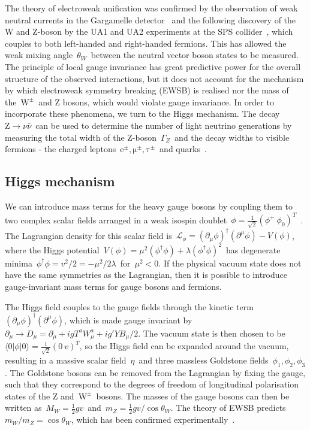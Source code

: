 The theory of electroweak unification was confirmed by the observation of weak neutral currents in the Gargamelle detector~\cite{Hasert:1973ff} and the following discovery of the W and Z-boson by the UA1 and UA2 experiments at the SPS collider~\cite{Arnison:1983mk}, which couples to both left-handed and right-handed fermions. This has allowed the weak mixing angle~$\theta_W$~between the neutral vector boson states to be measured. The principle of local gauge invariance has great predictive power for the overall structure of the observed interactions, but it does not account for the mechanism by which electroweak symmetry breaking (EWSB) is realised nor the mass of the~$\mathrm{W}^\pm$~and Z bosons, which would violate gauge invariance. In order to incorporate these phenomena, we turn to the Higgs mechanism. The decay~$\mathrm{Z} \rightarrow \nu \bar{\nu}$~can be used to determine the number of light neutrino generations by measuring the total width of the Z-boson~$\Gamma_Z$~and the decay widths to visible fermions - the charged leptons~$\mathrm{e}^\pm, \mathrm{\mu}^\pm, \mathrm{\tau}^\pm$~and quarks~\cite{Akrawy:1989pi}.

\subsection{Higgs mechanism}
We can introduce mass terms for the heavy gauge bosons by coupling them to two complex scalar fields arranged in a weak isospin doublet~$\phi = \frac{1}{\sqrt{2}} (\phi^+\ \phi_0)^T$~\cite{Higgs:1964ia,Higgs:1964pj,Englert:1964et,Guralnik:1964eu}. The Lagrangian density for this scalar field is~$\mathcal{L}_{\phi} = (\partial_\mu \phi)^\dagger (\partial^\mu \phi) - V(\phi)$, where the Higgs potential~$V(\phi) = \mu^2 (\phi^\dagger \phi) + \lambda (\phi^\dagger \phi)^2$~has degenerate minima~$\phi^\dagger \phi = v^2 / 2 = -\mu^2/2\lambda$~for~$\mu^2 < 0$. If the physical vacuum state does not have the same symmetries as the Lagrangian, then it is possible to introduce gauge-invariant mass terms for gauge bosons and fermions.

The Higgs field couples to the gauge fields through the kinetic term~$(\partial_{\mu} \phi)^\dagger (\partial^\mu \phi)$, which is made gauge invariant by~$\partial_\mu \rightarrow D_\mu = \partial_\mu + i g T^a W_\mu^a + i g' Y B_\mu / 2$. The vacuum state is then chosen to be~$\langle 0|\phi|0\rangle = \frac{1}{\sqrt{2}} (0\ v)^T$, so the Higgs field can be expanded around the vacuum, resulting in a massive scalar field~$\eta$~and three massless Goldstone fields~$\phi_1, \phi_2, \phi_3$. The Goldstone bosons can be removed from the Lagrangian by fixing the gauge, such that they correspond to the degrees of freedom of longitudinal polarisation states of the Z and~$\mathrm{W}^\pm$~bosons. The masses of the gauge bosons can then be written as~$M_W = \frac{1}{2} g v$~and~$m_Z = \frac{1}{2} g v / \cos{\theta_W}$. The theory of EWSB predicts~$m_W / m_Z = \cos{\theta_W}$, which has been confirmed experimentally~\cite{ALEPH:2005ab}.

